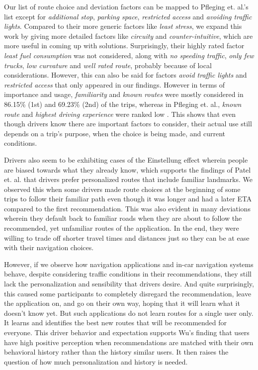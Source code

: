 Our list of route choice and deviation factors can be mapped to Pfleging et. al.'s list except for \emph{additional stop}, \emph{parking space}, \emph{restricted access} and \emph{avoiding traffic lights}. Compared to their more generic factors like \emph{least stress}, we expand this work by giving more detailed factors like \emph{circuity} and \emph{counter-intuitive}, which are more useful in coming up with solutions. Surprisingly, their highly rated factor \emph{least fuel consumption} was not considered, along with \emph{no speeding traffic}, \emph{only few trucks}, \emph{low curvature} and \emph{well rated route}, probably because of local considerations. However, this can also be said for factors \emph{avoid traffic lights} and \emph{restricted access} that  only appeared in our findings. However in terms of importance and usage, \emph{familiarity} and \emph{known routes} were mostly considered in 86.15\% (1st) and 69.23\% (2nd) of the trips, whereas in Pfleging et. al., \emph{known route} and \emph{highest driving experience} were ranked low \cite{Pfleging2014ExperienceNavigation}. This shows that even though drivers know there are important factors to consider, their actual use still depends on a trip's purpose, when the choice is being made, and current conditions. 

Drivers also seem to be exhibiting cases of the Einstellung effect \cite{Peterson2018} wherein people are biased towards what they already know, which supports the findings of Patel et. al. \cite{Patel2006PersonalizingRoutes} that drivers prefer personalized routes that include familiar landmarks. We observed this when some drivers made route choices at the beginning of some trips to follow their familiar path even though it was longer and had a later ETA compared to the first recommendation. This was also evident in many deviations wherein they default back to familiar roads when they are about to follow the recommended, yet unfamiliar routes of the application. In the end, they were willing to trade off shorter travel times and distances just so they can be at ease with their navigation choices.

However, if we observe how navigation applications and in-car navigation systems behave, despite considering traffic conditions in their recommendations, they still lack the personalization and sensibility that drivers desire. And quite surprisingly, this caused some participants to completely disregard the recommendation, leave the application on, and go on their own way, hoping that it will learn what it doesn't know yet. But such applications do not learn routes for a single user only. It learns and identifies the best new routes that will be recommended for everyone. This driver behavior and expectation supports Wu's \cite{Wu2015HybridSystems} finding that users have high positive perception when recommendations are matched with their own behavioral history rather than the history similar users. It then raises the question of how much personalization and history is needed.

